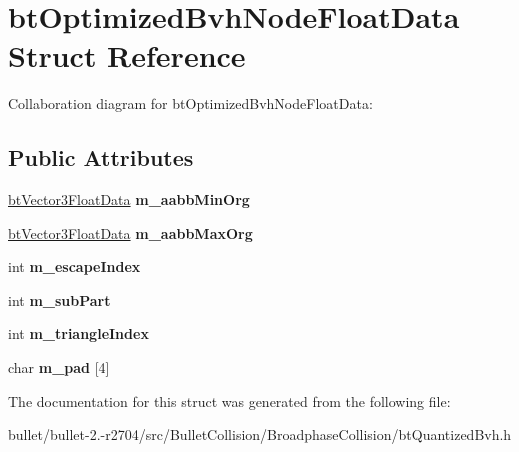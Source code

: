 \hypertarget{structbt_optimized_bvh_node_float_data}{\section{bt\+Optimized\+Bvh\+Node\+Float\+Data Struct Reference}
\label{structbt_optimized_bvh_node_float_data}
}


Collaboration diagram for bt\+Optimized\+Bvh\+Node\+Float\+Data\+:
\subsection*{Public Attributes}
\begin{DoxyCompactItemize}
\item 
\hypertarget{structbt_optimized_bvh_node_float_data_afe8619902ac9c23ed387f5407b04864e}{\hyperlink{structbt_vector3_float_data}{bt\+Vector3\+Float\+Data} {\bfseries m\+\_\+aabb\+Min\+Org}}\label{structbt_optimized_bvh_node_float_data_afe8619902ac9c23ed387f5407b04864e}

\item 
\hypertarget{structbt_optimized_bvh_node_float_data_a830ef80210da1df78fb23307fe6284f4}{\hyperlink{structbt_vector3_float_data}{bt\+Vector3\+Float\+Data} {\bfseries m\+\_\+aabb\+Max\+Org}}\label{structbt_optimized_bvh_node_float_data_a830ef80210da1df78fb23307fe6284f4}

\item 
\hypertarget{structbt_optimized_bvh_node_float_data_ac298d881245db2199ab68f0e223e7922}{int {\bfseries m\+\_\+escape\+Index}}\label{structbt_optimized_bvh_node_float_data_ac298d881245db2199ab68f0e223e7922}

\item 
\hypertarget{structbt_optimized_bvh_node_float_data_a13e8c2f0d64c7539a21688da92f19b28}{int {\bfseries m\+\_\+sub\+Part}}\label{structbt_optimized_bvh_node_float_data_a13e8c2f0d64c7539a21688da92f19b28}

\item 
\hypertarget{structbt_optimized_bvh_node_float_data_a9d718a3a3d2984d339d8a6240263aaea}{int {\bfseries m\+\_\+triangle\+Index}}\label{structbt_optimized_bvh_node_float_data_a9d718a3a3d2984d339d8a6240263aaea}

\item 
\hypertarget{structbt_optimized_bvh_node_float_data_ab651b81aa681ac6ee513f1d7b940a5ed}{char {\bfseries m\+\_\+pad} \mbox{[}4\mbox{]}}\label{structbt_optimized_bvh_node_float_data_ab651b81aa681ac6ee513f1d7b940a5ed}

\end{DoxyCompactItemize}


The documentation for this struct was generated from the following file\+:\begin{DoxyCompactItemize}
\item 
bullet/bullet-\/2.-\/r2704/src/\+Bullet\+Collision/\+Broadphase\+Collision/bt\+Quantized\+Bvh.\+h\end{DoxyCompactItemize}
